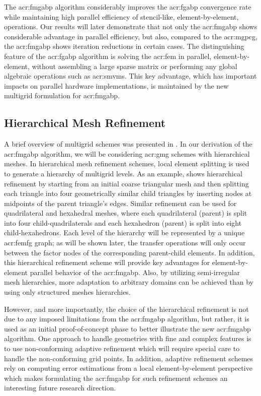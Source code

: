 The \gls{acr:fmgabp} algorithm considerably improves the \gls{acr:fgabp} convergence rate while maintaining high parallel efficiency of stencil-like, element-by-element, operations.
Our results will later demonstrate that not only the \gls{acr:fmgabp} shows considerable advantage in parallel efficiency, but also, compared to the \gls{acr:mgpcg}, the \gls{acr:fmgabp} shows iteration reductions in certain cases.
The distinguishing feature of the \gls{acr:fgabp} algorithm is solving the \gls{acr:fem} in parallel, element-by-element, without assembling a large sparse matrix or performing any global algebraic operations such as \glspl{acr:smvm}.
This key advantage, which has important impacts on parallel hardware implementations, is maintained by the new multigrid formulation for \gls{acr:fmgabp}.


\subsection{Hierarchical Mesh Refinement}


A brief overview of multigrid schemes was presented in .
In our derivation of the \gls{acr:fmgabp} algorithm, we will be considering \gls{acr:gmg} schemes with hierarchical meshes.
In hierarchical mesh refinement schemes, local element splitting is used to generate a hierarchy of multigrid levels.
As an example,  shows hierarchical refinement by starting from an initial coarse triangular mesh and then splitting each triangle into four geometrically similar child triangles by inserting nodes at midpoints of the parent triangle's edges.
Similar refinement can be used for quadrilateral and hexahedral meshes, where each quadrilateral (parent) is split into four child-quadrilaterals and each hexahedron (parent) is split into eight child-hexahedrons.
Each level of the hierarchy will be represented by a unique \gls{acr:femfg} graph; as will be shown later, the transfer operations will only occur between the factor nodes of the corresponding parent-child elements.
In addition, this hierarchical refinement scheme will provide key advantages for element-by-element parallel behavior of the \gls{acr:fmgabp}.
Also, by utilizing semi-irregular mesh hierarchies, more adaptation to arbitrary domains can be achieved than by using only structured meshes hierarchies.


However, and more importantly, the choice of the hierarchical refinement is not due to any imposed limitations from the \gls{acr:fmgabp} algorithm, but rather, it is used as an initial proof-of-concept phase to better illustrate the new \gls{acr:fmgabp} algorithm.
One approach to handle geometries with fine and complex features is to use non-conforming adaptive refinement \cite{bib:Becker2001AOCAAPEEFEM,bib:Bangerth2003AFEMDF} which will require special care to handle the non-conforming grid points.
In addition, adaptive refinement schemes rely on computing error estimations from a local element-by-element perspective which makes formulating the \gls{acr:fmgabp} for such refinement schemes an interesting future research direction.


